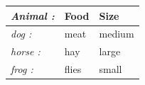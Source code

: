 \documentclass{article}
\begin{document}
 \begin{tabular}{>{\itshape}l<{:} *{2}{l}}
 \toprule
 Animal & Food & Size \\
 \midrule
 dog
 & meat & medium \\
 horse & hay & large \\
 frog & flies & small \\
 \bottomrule
 \end{tabular}
 
\end{document}
